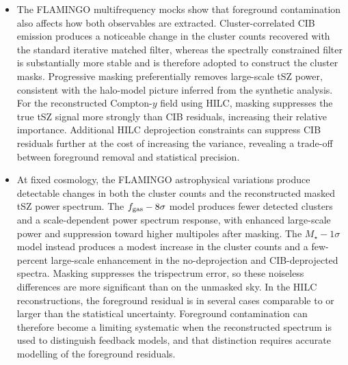 \documentclass[aps,prd,twocolumn,superscriptaddress,nofootinbib,floatfix]{revtex4-2}
\begin{document}
\begin{itemize}
    \item The FLAMINGO multifrequency mocks show that foreground contamination also affects how both observables are extracted. Cluster-correlated CIB emission produces a noticeable change in the cluster counts recovered with the standard iterative matched filter, whereas the spectrally constrained filter is substantially more stable and is therefore adopted to construct the cluster masks. Progressive masking preferentially removes large-scale tSZ power, consistent with the halo-model picture inferred from the synthetic analysis. For the reconstructed Compton-$y$ field using HILC, masking suppresses the true tSZ signal more strongly than CIB residuals, increasing their relative importance. Additional HILC deprojection constraints can suppress CIB residuals further at the cost of increasing the variance, revealing a trade-off between foreground removal and statistical precision.
    
    \item At fixed cosmology, the FLAMINGO astrophysical variations produce detectable changes in both the cluster counts and the reconstructed masked tSZ power spectrum. The $f_{\rm gas}-8\sigma$ model produces fewer detected clusters and a scale-dependent power spectrum response, with enhanced large-scale power and suppression toward higher multipoles after masking. The $M_\star-1\sigma$ model instead produces a modest increase in the cluster counts and a few-percent large-scale enhancement in the no-deprojection and CIB-deprojected spectra. Masking suppresses the trispectrum error, so these noiseless differences are more significant than on the unmasked sky. In the HILC reconstructions, the foreground residual is in several cases comparable to or larger than the statistical uncertainty. Foreground contamination can therefore become a limiting systematic when the reconstructed spectrum is used to distinguish feedback models, and that distinction requires accurate modelling of the foreground residuals.
\end{itemize}
\end{document}

